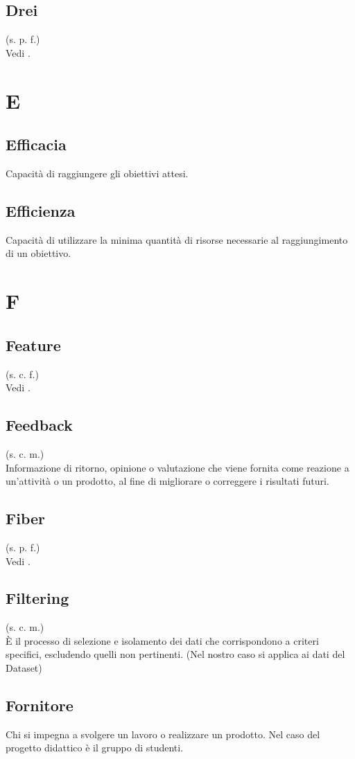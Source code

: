     \subsection{Drei}
    (s. p. f.)\\
    Vedi .
\pagebreak
\section{E}
    \subsection{Efficacia}
    Capacità di raggiungere gli obiettivi attesi.
    \subsection{Efficienza}
    Capacità di utilizzare la minima quantità di risorse necessarie al raggiungimento
    di un obiettivo.
\pagebreak
\section{F}
    \subsection{Feature}
    (s. c. f.)\\
    Vedi .
    \subsection{Feedback}
    (s. c. m.)\\
    Informazione di ritorno, opinione o valutazione che viene fornita come reazione a 
    un'attività o un prodotto, al fine di migliorare o correggere i risultati futuri.
    \subsection{Fiber}
    (s. p. f.)\\
    Vedi .
    \subsection{Filtering}
    (s. c. m.)\\
    È il processo di selezione e isolamento dei dati che corrispondono a criteri specifici, escludendo quelli non pertinenti. (Nel nostro caso si applica ai dati del Dataset)
    \subsection{Fornitore}
    Chi si impegna a svolgere un lavoro o realizzare un prodotto. Nel caso del progetto didattico
    è il gruppo di studenti.

